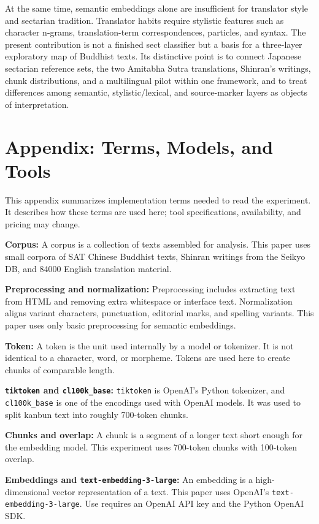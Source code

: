 \documentclass[uplatex,dvipdfmx,11pt,a4paper]{jsarticle}
\begin{document}
At the same time, semantic embeddings alone are insufficient for translator style and sectarian tradition. Translator habits require stylistic features such as character n-grams, translation-term correspondences, particles, and syntax. The present contribution is not a finished sect classifier but a basis for a three-layer exploratory map of Buddhist texts. Its distinctive point is to connect Japanese sectarian reference sets, the two Amitabha Sutra translations, Shinran's writings, chunk distributions, and a multilingual pilot within one framework, and to treat differences among semantic, stylistic/lexical, and source-marker layers as objects of interpretation.

\section*{Appendix: Terms, Models, and Tools}

This appendix summarizes implementation terms needed to read the experiment. It describes how these terms are used here; tool specifications, availability, and pricing may change.

\noindent\textbf{Corpus:} A corpus is a collection of texts assembled for analysis. This paper uses small corpora of SAT Chinese Buddhist texts, Shinran writings from the Seikyo DB, and 84000 English translation material.

\noindent\textbf{Preprocessing and normalization:} Preprocessing includes extracting text from HTML and removing extra whitespace or interface text. Normalization aligns variant characters, punctuation, editorial marks, and spelling variants. This paper uses only basic preprocessing for semantic embeddings.

\noindent\textbf{Token:} A token is the unit used internally by a model or tokenizer. It is not identical to a character, word, or morpheme. Tokens are used here to create chunks of comparable length.

\noindent\textbf{\texttt{tiktoken} and \texttt{cl100k\_base}:} \texttt{tiktoken} is OpenAI's Python tokenizer, and \texttt{cl100k\_base} is one of the encodings used with OpenAI models\cite{openai-tiktoken}. It was used to split kanbun text into roughly 700-token chunks.

\noindent\textbf{Chunks and overlap:} A chunk is a segment of a longer text short enough for the embedding model. This experiment uses 700-token chunks with 100-token overlap.

\noindent\textbf{Embeddings and \texttt{text-embedding-3-large}:} An embedding is a high-dimensional vector representation of a text. This paper uses OpenAI's \texttt{text-embedding-3-large}\cite{openai-embeddings}. Use requires an OpenAI API key and the Python OpenAI SDK.
\end{document}

